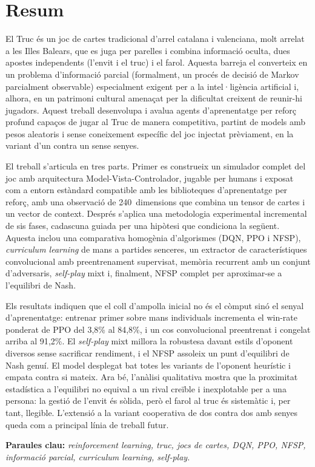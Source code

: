 
\chapter*{Resum}

El Truc és un joc de cartes tradicional d'arrel catalana i valenciana, molt arrelat a
les Illes Balears, que es juga per parelles i combina informació oculta, dues apostes
independents (l'envit i el truc) i el farol. Aquesta barreja el converteix en un problema
d'informació parcial (formalment, un procés de decisió de Markov parcialment observable)
especialment exigent per a la intel·ligència artificial i, alhora, en un patrimoni cultural
amenaçat per la dificultat
creixent de reunir-hi jugadors. Aquest treball desenvolupa i avalua agents d'aprenentatge
per reforç profund capaços de jugar al Truc de manera competitiva, partint de models amb pesos aleatoris i sense
coneixement específic del joc injectat prèviament, en la variant d'un contra un sense senyes.

El treball s'articula en tres parts. Primer es construeix un simulador complet del joc amb
arquitectura Model-Vista-Controlador, jugable per humans i exposat com a entorn estàndard compatible amb
les biblioteques d'aprenentatge per reforç, amb una observació de 240~dimensions que combina
un tensor de cartes i un vector de context. Després s'aplica una metodologia experimental
incremental de sis fases, cadascuna guiada per una hipòtesi que condiciona la següent.
Aquesta inclou una
comparativa homogènia d'algorismes (\acs{DQN}, \acs{PPO} i \acs{NFSP}), \emph{curriculum
learning} de mans a partides senceres, un extractor de característiques convolucional amb
preentrenament supervisat, memòria recurrent amb un conjunt d'adversaris, \emph{self-play}
mixt i, finalment, \acs{NFSP} complet per aproximar-se a l'equilibri de Nash.

Els resultats indiquen que el coll d'ampolla inicial no és el còmput sinó el senyal
d'aprenentatge: entrenar primer sobre mans individuals incrementa el win-rate ponderat de
\acs{PPO} del 3{,}8\% al 84{,}8\%, i un cos convolucional preentrenat i congelat arriba al
91{,}2\%. El \emph{self-play} mixt millora la robustesa davant estils d'oponent diversos
sense sacrificar rendiment, i el \acs{NFSP} assoleix un punt d'equilibri de Nash genuí. El
model desplegat bat totes les variants de l'oponent heurístic i empata contra si mateix. Ara
bé, l'anàlisi qualitativa mostra que la proximitat estadística a l'equilibri no equival a un
rival creïble i inexplotable per a una persona: la gestió de l'envit és sòlida, però el farol
al truc és sistemàtic i, per tant, llegible. L'extensió a la variant cooperativa de dos
contra dos amb senyes queda com a principal línia de treball futur.

\bigskip
\noindent\textbf{Paraules clau:} \emph{reinforcement learning, truc, jocs de cartes, DQN, PPO, NFSP, informació parcial, curriculum learning, self-play.}
